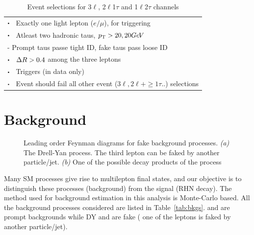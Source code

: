 \documentclass[letterpaper,12pt]{article}
\newcommand\sbullet[1][.5]{\mathbin{\vcenter{\hbox{\scalebox{#1}{$\bullet$}}}}}  %
\newcommand{\GeV}{{Ge\kern -0.1em V}}
\begin{document}
\begin{table}
{\begin{tabular}{l}
    \hline
    $\sbullet \hspace{0.2cm}$ Exactly one light lepton ($e/\mu$), for triggering\\
    $\sbullet \hspace{0.2cm}$ Atleast two hadronic taus, $\pt>20,20 \GeV$\\
    \hspace{1cm}- Prompt taus passe tight ID, fake taus pass loose ID\\
    $\sbullet \hspace{0.2cm}$ $\Delta R>0.4$ among the three leptons\\
    $\sbullet \hspace{0.2cm}$ Triggers (in data only)\\
    $\sbullet \hspace{0.2cm}$ Event should fail all other event ($3\ell,2\ell+\geq1\tau..$) selections\\
    \hline \hline
    \end{tabular}%
  }
  \caption{Event selections for 3$\ell$, 2$\ell$1$\tau$ and 1$\ell$2$\tau$ channels}
  \label{tab:eventsel}
\end{table}

\section{Background}
\label{sec:bkgs}

\begin{figure}
  \begin{adjustbox}{minipage=\textwidth, scale=0.75}
    \centering
    \qquad
    \caption{\normalsize{Leading order Feynman diagrams for fake background processes. \emph{(a)} The Drell-Yan process. The third lepton can be faked by another particle/jet. \emph{(b)} One of the possible decay products of the \ttbar{} process}}
    \label{fig:bkgsfeyn}
  \end{adjustbox}
\end{figure}
Many SM processes give rise to multilepton final states, and our objective is to distinguish these processes (background) from the signal (RHN decay). The method used for background estimation in this analysis is Monte-Carlo based. All the background processes considered are listed in Table~\ref{tab:bkgs}. \WZ{} and \ZZ{} are prompt backgrounds while DY and \ttbar{} are fake (\ie{} one of the leptons is faked by another particle/jet).   
\end{document}
